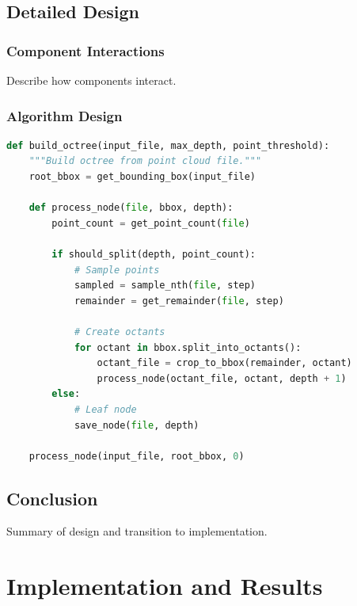 \documentclass[12pt,a4paper,onecolumn,oneside]{report}
\begin{document}
\section{Detailed Design}
\label{sec:design:detailed}

\subsection{Component Interactions}
\label{sec:design:interactions}

Describe how components interact.

\subsection{Algorithm Design}
\label{sec:design:algorithm}

\begin{lstlisting}[language=Python, caption=Octree Building Algorithm, label=lst:algorithm]
def build_octree(input_file, max_depth, point_threshold):
    """Build octree from point cloud file."""
    root_bbox = get_bounding_box(input_file)
    
    def process_node(file, bbox, depth):
        point_count = get_point_count(file)
        
        if should_split(depth, point_count):
            # Sample points
            sampled = sample_nth(file, step)
            remainder = get_remainder(file, step)
            
            # Create octants
            for octant in bbox.split_into_octants():
                octant_file = crop_to_bbox(remainder, octant)
                process_node(octant_file, octant, depth + 1)
        else:
            # Leaf node
            save_node(file, depth)
    
    process_node(input_file, root_bbox, 0)
\end{lstlisting}

\section{Conclusion}
\label{sec:design:conclusion}

Summary of design and transition to implementation.


\chapter{Implementation and Results}
\label{chap:implementation}
\end{document}
